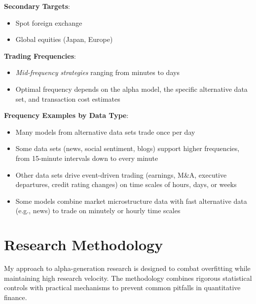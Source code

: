 \documentclass[11pt, letterpaper]{article}
\begin{document}
  \textbf{Secondary Targets}:

  \begin{itemize}
    \item Spot foreign exchange

    \item Global equities (Japan, Europe)
  \end{itemize}

  \textbf{Trading Frequencies}:

  \begin{itemize}
    \item \textit{Mid-frequency strategies} ranging from minutes to days

    \item Optimal frequency depends on the alpha model, the specific
      alternative data set, and transaction cost estimates
  \end{itemize}

  \textbf{Frequency Examples by Data Type}:

  \begin{itemize}
    \item Many models from alternative data sets trade once per day

    \item Some data sets (news, social sentiment, blogs) support higher
      frequencies, from 15-minute intervals down to every minute

    \item Other data sets drive event-driven trading (earnings, M\&A,
      executive departures, credit rating changes) on time scales of
      hours, days, or weeks

    \item Some models combine market microstructure data with fast
      alternative data (e.g., news) to trade on minutely or hourly
      time scales
  \end{itemize}

  \section{Research Methodology}
  \label{research-methodology}

  My approach to alpha-generation research is designed to combat overfitting
  while maintaining high research velocity. The methodology combines
  rigorous statistical controls with practical mechanisms to prevent
  common pitfalls in quantitative finance.
\end{document}
